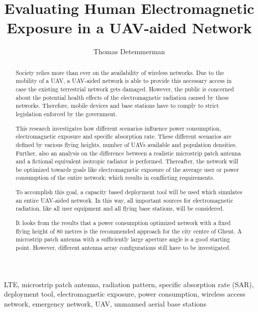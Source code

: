 \documentclass[twocolumn]{phdsymp} %
\begin{document}
\title{Evaluating Human Electromagnetic Exposure in a \gls{UAV}-aided Network}

\author{Thomas Detemmerman}


\maketitle

\begin{abstract}
Society relies more than ever on the availability of wireless networks.
Due to the mobility of a UAV, a UAV-aided network is able to provide this necessary access in case the existing terrestrial network gets damaged.
However,  the public is 
concerned about the potential health effects of the electromagnetic radiation caused by these networks.
Therefore, mobile devices and base stations have to comply to strict legislation enforced by the government.

This research investigates how different scenarios influence power consumption, electromagnetic exposure and specific absorption rate.
These different scenarios are defined by various flying heights, number of UAVs available and population densities. Further, also 
an analysis on the difference
between a realistic microstrip patch antenna and a fictional equivalent isotropic radiator is performed.
Thereafter, the network will be optimized towards goals like electromagnetic exposure of the average user or 
power consumption of the entire network; which results in conflicting requirements.

To accomplish this goal, a capacity based deployment tool will be used which simulates an entire UAV-aided network.
In this way, all important sources for electromagnetic radiation, like all user equipment and all flying base stations, 
will be considered.

It looks from the results that a power consumption optimized network with a fixed flying height of 80 metres is the recommended approach
for the city centre of Ghent.
A microstrip patch 
antenna with a sufficiently large aperture angle is a good starting point. However, different antenna array configurations still have to 
be investigated.
\end{abstract}

\begin{keywords}
LTE, microstrip patch antenna, radiation pattern, specific absorption rate (SAR),
deployment tool, electromagnetic exposure, power consumption, wireless access network, 
emergency network, UAV, unmanned aerial base stations
\end{keywords}
\end{document}
